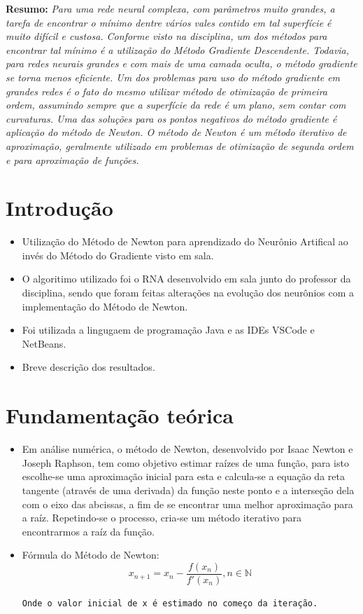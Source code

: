 \documentclass[12pt]{article}
\begin{document}
\noindent\textbf{Resumo:} \textit{Para uma rede neural complexa, com parâmetros muito grandes, a tarefa de encontrar o mínimo dentre vários vales contido em tal superfície é muito difícil e custosa. 
Conforme visto na disciplina, um dos métodos para encontrar tal mínimo é a utilização do Método Gradiente Descendente. Todavia, para redes neurais grandes e com mais de uma camada oculta, o método gradiente se torna menos eficiente.
Um dos problemas para uso do método gradiente em grandes redes é o fato do mesmo utilizar método de otimização de primeira ordem, assumindo sempre que a superfície da rede é um plano, sem contar com curvaturas. Uma das soluções para os pontos negativos do método gradiente é aplicação do método de Newton. 
O método de Newton é um método iterativo de aproximação, geralmente utilizado em problemas de otimização de segunda ordem e para aproximação de funções.} 

\section{Introdução} 

\begin{itemize}
    \item Utilização do Método de Newton para aprendizado do Neurônio Artifical ao invés do Método do Gradiente visto em sala.
    \item O algoritimo utilizado foi o RNA desenvolvido em sala junto do professor da disciplina, sendo que foram feitas alterações na evolução dos neurônios com a implementação do Método de Newton.
    \item Foi utilizada a lingugaem de programação Java e as IDEs VSCode e NetBeans.
    \item Breve descrição dos resultados.
\end{itemize}

\section{Fundamentação teórica}

\begin{itemize}
    \item Em análise numérica, o método de Newton, desenvolvido por Isaac Newton e Joseph Raphson, tem como objetivo estimar raízes de uma função, para isto escolhe-se uma aproximação inicial para esta e calcula-se a equação da reta tangente (através de uma derivada) da função neste ponto e a interseção dela com o eixo das abcissas, a fim de se encontrar uma melhor aproximação para a raíz. Repetindo-se o processo, cria-se um método iterativo para encontrarmos a raíz da função.
    \item Fórmula do Método de Newton:
    \begin{equation}
        x_{n+1} = x_n - \frac{f(x_n)}{f'(x_n)}, n \in \mathbb{N}
    \end{equation}
    \begin{center}
        \small{\texttt{Onde o valor inicial de x é estimado no começo da iteração.}}
    \end{center}
\end{itemize}
\end{document}
